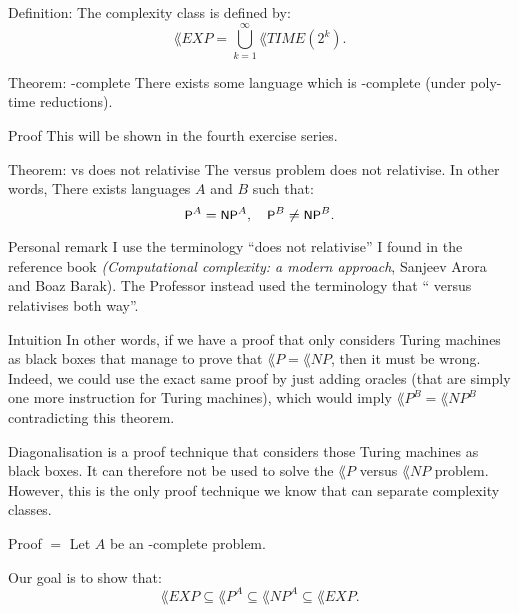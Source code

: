 \documentclass[a4paper]{article}
\begin{document}
\begin{parag}{Definition: }
    The  complexity class is defined by: 
    \[\lang{EXP} = \bigcup_{k=1}^{\infty} \lang{TIME}\left(2^k\right).\]
\end{parag}
    
\begin{parag}{Theorem: -complete}
    There exists some language which is -complete (under poly-time reductions).

    \begin{subparag}{Proof}
        This will be shown in the fourth exercise series.
    \end{subparag}
\end{parag}

\begin{parag}{Theorem:  vs  does not relativise}
    The  versus  problem does not relativise. In other words, There exists languages $A$ and $B$ such that: 
    \[\lang{P}^A = \lang{NP}^A, \mathspace \lang{P}^B \neq \lang{NP}^B.\]

    \begin{subparag}{Personal remark}
        I use the terminology ``does not relativise'' I found in the reference book \textit{(Computational complexity: a modern approach}, Sanjeev Arora and Boaz Barak). The Professor instead used the terminology that `` versus  relativises both way''. 
    \end{subparag}

    \begin{subparag}{Intuition}
        In other words, if we have a proof that only considers Turing machines as black boxes that manage to prove that $\lang{P} = \lang{NP}$, then it must be wrong. Indeed, we could use the exact same proof by just adding oracles (that are simply one more instruction for Turing machines), which would imply $\lang{P}^B = \lang{NP}^B$ contradicting this theorem.

        Diagonalisation is a proof technique that considers those Turing machines as black boxes. It can therefore not be used to solve the $\lang{P}$ versus $\lang{NP}$ problem. However, this is the only proof technique we know that can separate complexity classes.
    \end{subparag}

    \begin{subparag}{Proof $=$}
        Let $A$ be an -complete problem.

        Our goal is to show that: 
        \[\lang{EXP} \subseteq \lang{P}^A \subseteq \lang{NP}^A \subseteq \lang{EXP}.\]


\end{subparag}
\end{parag}
\end{document}
